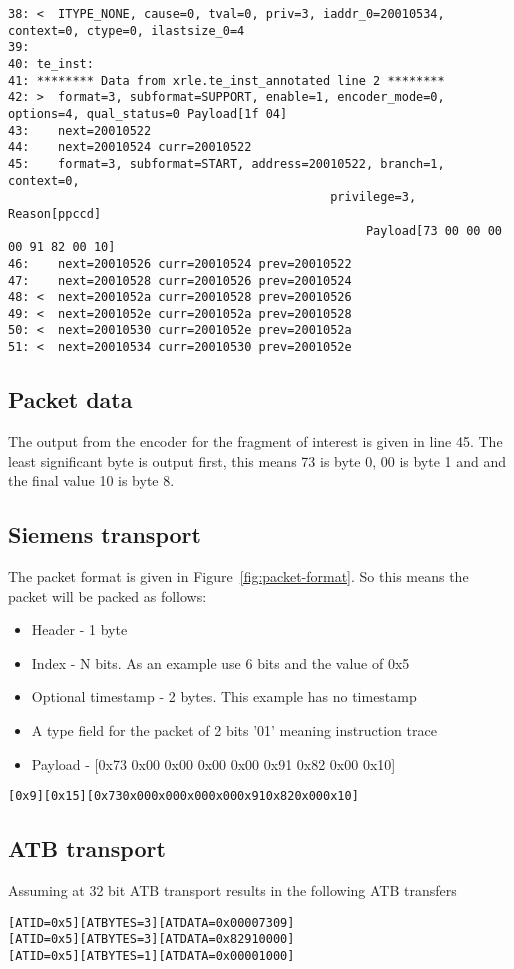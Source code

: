 \begin{lstlisting}[basicstyle=\tiny]
38: <  ITYPE_NONE, cause=0, tval=0, priv=3, iaddr_0=20010534, context=0, ctype=0, ilastsize_0=4
39:
40: te_inst:
41: ******** Data from xrle.te_inst_annotated line 2 ********
42: >  format=3, subformat=SUPPORT, enable=1, encoder_mode=0, options=4, qual_status=0 Payload[1f 04]
43:    next=20010522
44:    next=20010524 curr=20010522
45:    format=3, subformat=START, address=20010522, branch=1, context=0,
                                             privilege=3, Reason[ppccd]
                                                  Payload[73 00 00 00 00 91 82 00 10]
46:    next=20010526 curr=20010524 prev=20010522
47:    next=20010528 curr=20010526 prev=20010524
48: <  next=2001052a curr=20010528 prev=20010526
49: <  next=2001052e curr=2001052a prev=20010528
50: <  next=20010530 curr=2001052e prev=2001052a
51: <  next=20010534 curr=20010530 prev=2001052e
\end{lstlisting}

\subsection{Packet data}

The output from the encoder for the fragment of interest is given in
line 45. The least significant byte is output first, this means 73 is
byte 0, 00 is byte 1 and and the final value 10 is byte 8.

\subsection{Siemens transport}

The packet format is given in Figure~\ref{fig:packet-format}. So this means the packet will be packed as follows:

\begin{itemize}
\item
  Header - 1 byte
\item
  Index - N bits. As an example use 6 bits and the value of 0x5
\item
  Optional timestamp - 2 bytes. This example has no timestamp
\item
A type field for the packet of 2 bits '01' meaning instruction trace  
\item
  Payload - [0x73 0x00 0x00 0x00 0x00 0x91 0x82 0x00 0x10]
\end{itemize}

\begin {alltt}
  [0x9][0x15][0x73 0x00 0x00 0x00 0x00 0x91 0x82 0x00 0x10]
\end{alltt}
\subsection{ATB transport}

Assuming at 32 bit ATB transport results in the following ATB transfers

\begin {alltt}
[ATID=0x5] [ATBYTES = 3] [ATDATA = 0x00007309]
[ATID=0x5] [ATBYTES = 3] [ATDATA = 0x82910000]
[ATID=0x5] [ATBYTES = 1] [ATDATA = 0x00001000]
\end{alltt}
